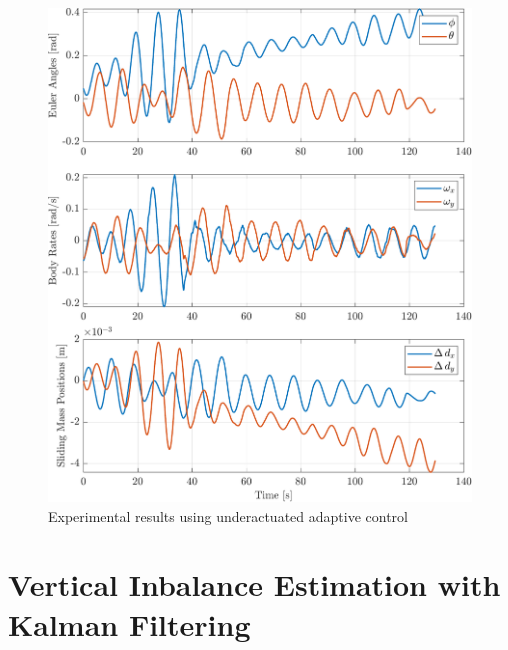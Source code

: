 \begin{figure}[!ht]
    \centering
    \includegraphics[width=\linewidth]{plots/adaptive_hardware_failure.pdf}
    \caption{Experimental results using underactuated adaptive control}
\end{figure}


\section{Vertical Inbalance Estimation with Kalman Filtering}

